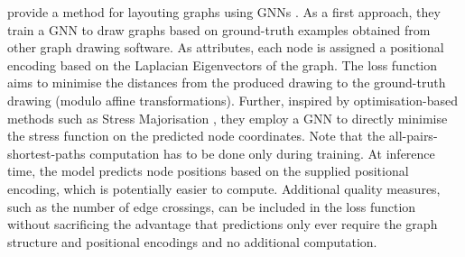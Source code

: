 \documentclass[
	fontsize=10pt, %
	twoside=false, %
	secnumdepth=1, %
  toc=indentunnumbered %
]{kaobook}
\begin{document}
\citeauthor{tiezzi_GraphNeuralNetworks_2021} provide a method for layouting
graphs using GNNs
\cite{tiezzi_GraphNeuralNetworks_2021}
. As a first approach, they train a GNN to draw graphs based on
ground-truth examples obtained from other graph drawing software. As attributes,
each node is assigned a positional encoding based on the Laplacian Eigenvectors
of the graph. The loss function aims to minimise the distances from the produced
drawing to the ground-truth drawing (modulo affine transformations).
Further, inspired by optimisation-based methods such as Stress Majorisation
\cite{gansner_GraphDrawingStress_2005}, they employ a GNN to directly minimise
the stress function on the predicted node coordinates. Note that the
all-pairs-shortest-paths computation has to be done only during training. At
inference time, the model predicts node positions based on the supplied
positional encoding, which is potentially easier to compute. Additional quality
measures, such as the number of edge crossings, can be included in the loss
function without sacrificing the advantage that predictions only ever require
the graph structure and positional encodings and no additional computation.


\end{document}
